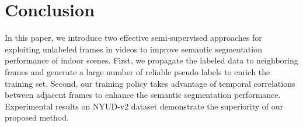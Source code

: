 \section{Conclusion}
\label{sec:conclusion}
In this paper, we introduce two effective semi-supervised approaches for exploiting unlabeled frames in videos to improve semantic segmentation performance of indoor scenes. 
First, we propagate the labeled data to neighboring frames and generate a large number of reliable pseudo labels to enrich the training set.
%
Second, our training policy takes advantage of temporal correlations between adjacent frames to enhance the semantic segmentation performance.
%
Experimental results on NYUD-v2 dataset demonstrate the superiority of our proposed method.  
%
%

